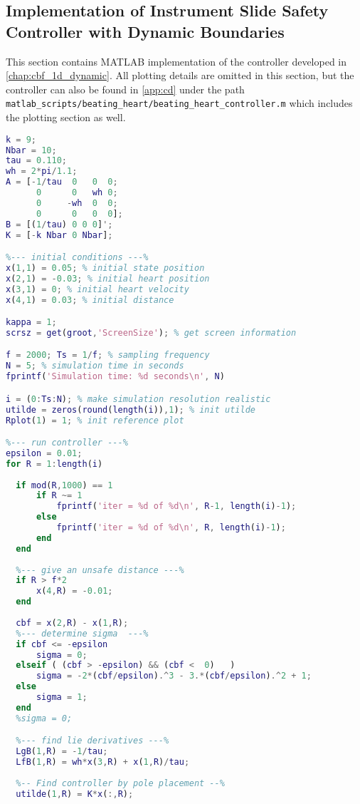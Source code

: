 \subsection{Implementation of Instrument Slide Safety Controller with Dynamic Boundaries}\label{sec:app:dynamic}
This section contains MATLAB implementation of the controller developed in \autoref{chap:cbf_1d_dynamic}. All plotting details are omitted in this section, but the controller can also be found in \autoref{app:cd} under the path \texttt{matlab\_scripts/beating\_heart/beating\_heart\_controller.m} which includes the plotting section as well.\\

\begin{lstlisting}[language=matlab]
%--- setup systems ---%
k = 9;
Nbar = 10;
tau = 0.110;
wh = 2*pi/1.1;
A = [-1/tau  0   0  0;
      0      0   wh 0;
      0     -wh  0  0;
      0      0   0  0];
B = [(1/tau) 0 0 0]';
K = [-k Nbar 0 Nbar];

%--- initial conditions ---%
x(1,1) = 0.05; % initial state position
x(2,1) = -0.03; % initial heart position
x(3,1) = 0; % initial heart velocity
x(4,1) = 0.03; % initial distance

kappa = 1;
scrsz = get(groot,'ScreenSize'); % get screen information

f = 2000; Ts = 1/f; % sampling frequency
N = 5; % simulation time in seconds
fprintf('Simulation time: %d seconds\n', N)

i = (0:Ts:N); % make simulation resolution realistic
utilde = zeros(round(length(i)),1); % init utilde
Rplot(1) = 1; % init reference plot

%--- run controller ---%
epsilon = 0.01; 
for R = 1:length(i)
    
  if mod(R,1000) == 1 
      if R ~= 1
          fprintf('iter = %d of %d\n', R-1, length(i)-1);
      else
          fprintf('iter = %d of %d\n', R, length(i)-1);
      end
  end
  
  %--- give an unsafe distance ---%
  if R > f*2 
      x(4,R) = -0.01;
  end
  
  cbf = x(2,R) - x(1,R);
  %--- determine sigma  ---% 
  if cbf <= -epsilon
      sigma = 0;
  elseif ( (cbf > -epsilon) && (cbf <  0)   )
      sigma = -2*(cbf/epsilon).^3 - 3.*(cbf/epsilon).^2 + 1;
  else
      sigma = 1;
  end
  %sigma = 0;

  %--- find lie derivatives ---%
  LgB(1,R) = -1/tau;
  LfB(1,R) = wh*x(3,R) + x(1,R)/tau;
  
  %-- Find controller by pole placement --%
  utilde(1,R) = K*x(:,R);


\end{lstlisting}
